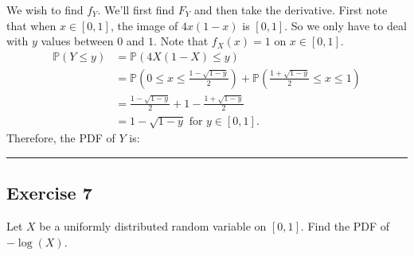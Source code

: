 \documentclass{article}
\theoremstyle{break}
\newenvironment{solution}{{\bf Solution:}}{\hfill\rule{2mm}{2mm}}
\newcommand{\R}{\mathbb{R}}
\renewcommand{\P}{\mathbb{P}}
\begin{document}
\begin{solution}
We wish to find $f_Y$. We'll first find $F_Y$ and then take the derivative. First note that when $x \in [0,1]$, the image of $4x(1-x)$ is $[0,1]$. So we only have to deal with $y$ values between $0$ and $1$. Note that $f_X(x) = 1$ on $x \in [0,1]$. 
\begin{align*}
\P(Y \leq y) &= \P(4X(1-X) \leq y) \\
	&= \P \left( 0 \leq x \leq \frac{1 - \sqrt{1-y}}{2} \right) + \P \left(\frac{1 + \sqrt{1-y}}{2} \leq x \leq 1 \right) \\
	&= \frac{1 - \sqrt{1-y}}{2} + 1 - \frac{1 + \sqrt{1-y}}{2} \\
	&= 1 - \sqrt{1-y} \text{ for } y \in [0,1].
\end{align*}
Therefore, the PDF of $Y$ is:
\[ 
\]


\begin{comment}
Let $X$ be uniformly distributed on $[0,1]$, let $g(x) = 4x(1-x)$, and let $Y = g(X)$. Since $X$ is continuous, $g(x)$ is continuous, and assuming $F_Y$ is differentiable, we can again use Proposition 2.6 from the notes. 

Since $X$ is uniformly distributed on $[0,1]$, $f_X = 1$ for $x \in [0,1]$ and $f_X = 0$ otherwise. Then \begin{align*}
F_Y(y) &= \frac{d}{dy} \int_{\{x \in \R : g(x) \leq y\}} f_X(x)dx \\
&= \frac{d}{dy} \int_{\{x \in [0,1]: 4x(1-x) \leq y \}} 1  dx.
\end{align*}
If $y < 0$, the integral is zero. If $y > 1$, the integral is 1. If $y \in [0, 1]$, we have
\begin{align*}
f_Y(y) &= \frac{d}{dy} \int_{\{x \in [0,1]: 4x(1-x) \leq y \}} 1  dx \\
	&= \frac{d}{dy} \left[ 1 -  \int_{\{x \in [0,1]: 4x(1-x) > y \}} 1 dx \right] \\
	&= \frac{d}{dy} \left[ 1 -  \int_{\{x \in [0,1]: 4x(1-x) > y \}} 1 dx \right] 
\end{align*}
\end{comment}





\end{solution}

\subsection*{Exercise 7}
Let $X$ be a uniformly distributed random variable on $[0,1]$. Find the PDF of $-\log(X)$.
\end{document}
